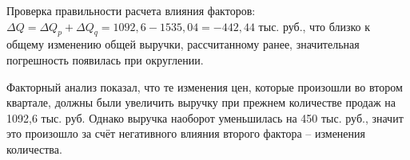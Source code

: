 \documentclass[fleqn]{article}
\begin{document}
Проверка правильности расчета влияния факторов: $\Delta Q =\Delta Q_p+\Delta Q_q =1092,6-1535,04=-442,44$ тыс. руб., что близко к общему изменению общей выручки, рассчитанному ранее, значительная погрешность появилась при округлении.


Факторный анализ показал, что те изменения цен, которые произошли во втором квартале, должны были увеличить выручку при прежнем количестве продаж на 1092,6 тыс. руб. Однако выручка наоборот уменьшилась на 450 тыс. руб., значит это произошло за счёт негативного влияния второго фактора -- изменения количества.

\begin{comment}
\end{comment}
\end{document}
